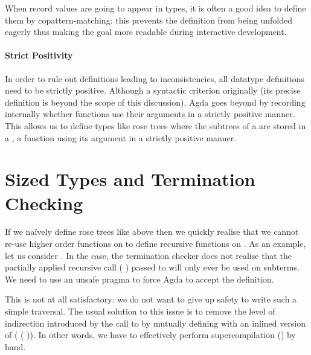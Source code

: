 
When record values are going to appear in types, it is often a good idea to define
them by copattern-matching: this prevents the definition from being unfolded eagerly
thus making the goal more readable during interactive development.

\paragraph{Strict Positivity} In order to rule out definitions leading to
inconsistencies, all datatype definitions need to be strictly positive.
Although a syntactic criterion originally (its precise definition is beyond
the scope of this discussion), Agda goes beyond by recording internally
whether functions use their arguments in a strictly positive manner.
This allows us to define types like rose trees where the subtrees of a
 are stored in a , a function using its 
argument in a strictly positive manner.


\section{Sized Types and Termination Checking}
\label{sec:sizetermination}

If we naïvely define rose trees like above then we quickly realise that we cannot
re-use higher order functions on  to define recursive functions on .
As an example, let us consider . In the  case,
the termination checker does not realise that the partially applied recursive call
( ) passed to 
will only ever be used on subterms. We need to use an unsafe  pragma
to force Agda to accept the definition.


This is not at all satisfactory: we do not want to give up safety to write such a
simple traversal. The usual solution to this issue is to remove the level of
indirection introduced by the call to  by mutually
defining with  an inlined version of
( ( )).
In other words, we have to effectively perform supercompilation
(\cite{mendelgleason2012}) by hand.

